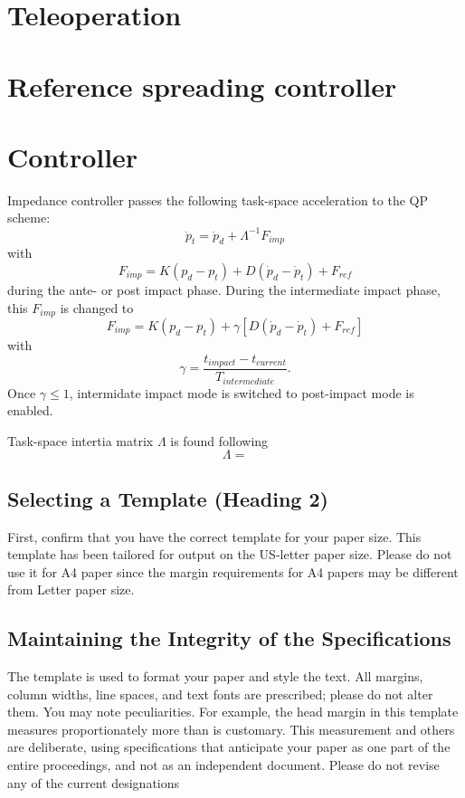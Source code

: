 \documentclass[a4paper, 10pt, conference]{ieeeconf}
\begin{document}
    \section{Teleoperation}

    \section{Reference spreading controller}


    \section{Controller}
    Impedance controller passes the following task-space acceleration to the QP scheme:
    $$\ddot{p}_t = \ddot{p}_d + \Lambda^{-1}F_{imp}$$
    with 
    $$F_{imp} =  K(p_d-p_t)+D (\dot{p}_d-\dot{p}_t) +F_{ref} $$
    during the ante- or post impact phase. During the intermediate impact phase, this $F_{imp}$ is changed to 
    $$F_{imp} =  K(p_d-p_t)+ \gamma [ D (\dot{p}_d-\dot{p}_t) +F_{ref}] $$
    with $$\gamma = \frac{ t_{impact}-t_{current}}{T_{intermediate}}.$$ Once $\gamma \leq 1$, intermidate impact mode is switched to post-impact mode is enabled.

    Task-space intertia matrix $\Lambda$ is found following $$\Lambda = $$
    \subsection{Selecting a Template (Heading 2)}

    First, confirm that you have the correct template for your paper size. This template has been tailored for output on the US-letter paper size. Please do not use it for A4 paper since the margin requirements for A4 papers may be different from Letter paper size.

    \subsection{Maintaining the Integrity of the Specifications}

    The template is used to format your paper and style the text. All margins, column widths, line spaces, and text fonts are prescribed; please do not alter them. You may note peculiarities. For example, the head margin in this template measures proportionately more than is customary. This measurement and others are deliberate, using specifications that anticipate your paper as one part of the entire proceedings, and not as an independent document. Please do not revise any of the current designations
\end{document}
